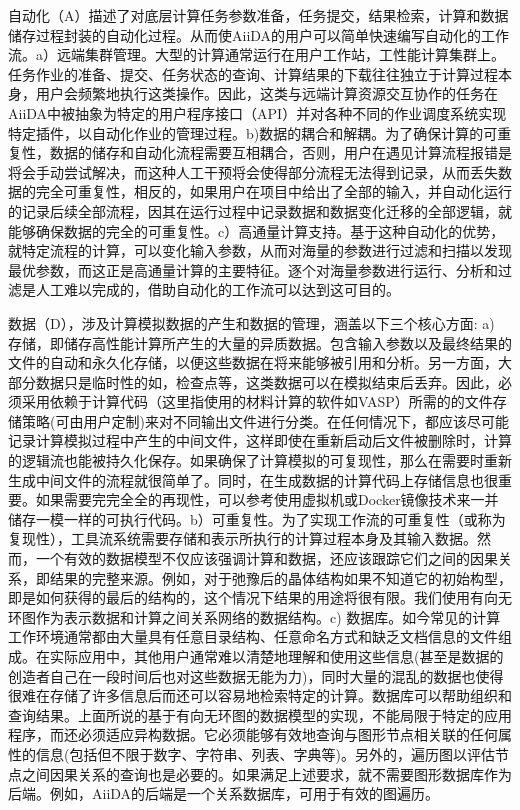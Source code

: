 自动化（A）描述了对底层计算任务参数准备，任务提交，结果检索，计算和数据储存过程封装的自动化过程。从而使AiiDA的用户可以简单快速编写自动化的工作流。a）远端集群管理。大型的计算通常运行在用户工作站，工性能计算集群上。任务作业的准备、提交、任务状态的查询、计算结果的下载往往独立于计算过程本身，用户会频繁地执行这类操作。因此，这类与远端计算资源交互协作的任务在AiiDA中被抽象为特定的用户程序接口（API）并对各种不同的作业调度系统实现特定插件，以自动化作业的管理过程。b)数据的耦合和解耦。为了确保计算的可重复性，数据的储存和自动化流程需要互相耦合，否则，用户在遇见计算流程报错是将会手动尝试解决，而这种人工干预将会使得部分流程无法得到记录，从而丢失数据的完全可重复性，相反的，如果用户在项目中给出了全部的输入，并自动化运行的记录后续全部流程，因其在运行过程中记录数据和数据变化迁移的全部逻辑，就能够确保数据的完全的可重复性。c）高通量计算支持。基于这种自动化的优势，就特定流程的计算，可以变化输入参数，从而对海量的参数进行过滤和扫描以发现最优参数，而这正是高通量计算的主要特征。逐个对海量参数进行运行、分析和过滤是人工难以完成的，借助自动化的工作流可以达到这可目的。

数据（D），涉及计算模拟数据的产生和数据的管理，涵盖以下三个核心方面: a) 存储，即储存高性能计算所产生的大量的异质数据。包含输入参数以及最终结果的文件的自动和永久化存储，以便这些数据在将来能够被引用和分析。另一方面，大部分数据只是临时性的如，检查点等，这类数据可以在模拟结束后丢弃。因此，必须采用依赖于计算代码（这里指使用的材料计算的软件如VASP）所需的的文件存储策略(可由用户定制)来对不同输出文件进行分类。在任何情况下，都应该尽可能记录计算模拟过程中产生的中间文件，这样即使在重新启动后文件被删除时，计算的逻辑流也能被持久化保存。如果确保了计算模拟的可复现性，那么在需要时重新生成中间文件的流程就很简单了。同时，在生成数据的计算代码上存储信息也很重要。如果需要完完全全的再现性，可以参考使用虚拟机或Docker镜像技术来一并储存一模一样的可执行代码。b）可重复性。为了实现工作流的可重复性（或称为复现性），工具流系统需要存储和表示所执行的计算过程本身及其输入数据。然而，一个有效的数据模型不仅应该强调计算和数据，还应该跟踪它们之间的因果关系，即结果的完整来源。例如，对于弛豫后的晶体结构如果不知道它的初始构型，即是如何获得的最后的结构的，这个情况下结果的用途将很有限。我们使用有向无环图作为表示数据和计算之间关系网络的数据结构。c) 数据库。如今常见的计算工作环境通常都由大量具有任意目录结构、任意命名方式和缺乏文档信息的文件组成。在实际应用中，其他用户通常难以清楚地理解和使用这些信息(甚至是数据的创造者自己在一段时间后也对这些数据无能为力)，同时大量的混乱的数据也使得很难在存储了许多信息后而还可以容易地检索特定的计算。数据库可以帮助组织和查询结果。上面所说的基于有向无环图的数据模型的实现，不能局限于特定的应用程序，而还必须适应异构数据。它必须能够有效地查询与图形节点相关联的任何属性的信息(包括但不限于数字、字符串、列表、字典等)。另外的，遍历图以评估节点之间因果关系的查询也是必要的。如果满足上述要求，就不需要图形数据库作为后端。例如，AiiDA的后端是一个关系数据库，可用于有效的图遍历。

